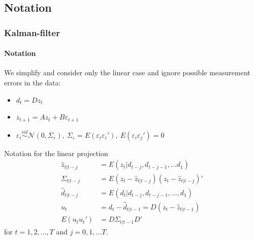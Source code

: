 \documentclass[handout]{beamer}  %
\begin{document}
\subsection{Notation}
\begin{frame}\frametitle{Kalman-filter}\framesubtitle{Notation}
We simplify and consider only the linear case and ignore possible measurement errors in the data:
\begin{itemize}
    \item $d_t = D z_t$
    \item $    z_{t+1} = A z_t + B \varepsilon_{t+1}$
    \item $\varepsilon_{i} \overset{iid}{\sim} \mathcal{N}(0,\Sigma_\varepsilon),~ \Sigma_\varepsilon = E(\varepsilon_{i} \varepsilon_{i}'), ~ E(\varepsilon_{i} \varepsilon_{j}')=0$
  \end{itemize}
\scriptsize
\begin{block}{Notation for the linear projection}
\begin{align*}
{\widehat{z}_{t|t-j}} &= E({z_t}|{d_{t-j}},{d_{t-j-1}},\dots {d_{1}})\\
{\Sigma_{t|t-j}} &= E({z_t}-{\widehat{z}_{t|t-j}})({z_t}-{\widehat{z}_{t|t-j}})'\\
{\widehat{d}_{t|t-j}} &= E({d_t|d_{t-j}},{d_{t-j-1}},\dots,{d_1})\\
{u_t} &= {d_t} - {\widehat{d}_{t|t-1}} = {D} ({z_t} - {\widehat{z}_{t|t-1}})\\
E({u_t}{u_t}')&= {D} {\Sigma_{t|t-1}} {D'}
\end{align*}
for $t=1,2,\dots,T$ and $j=0,1,\dots T$.
\end{block}

\end{frame}
\end{document}
